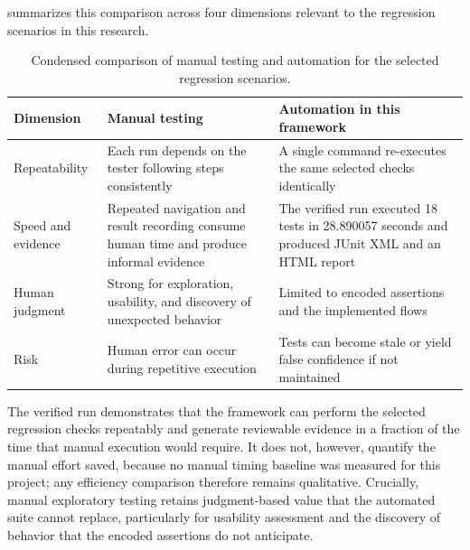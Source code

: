  summarizes this comparison across four dimensions relevant to the regression scenarios in this research.

\begin{table}[htbp]
  \centering
  \tablefont
  \begin{tabularx}{\textwidth}{YYY}
    \toprule
    Dimension & Manual testing & Automation in this framework \\
    \midrule
    Repeatability & Each run depends on the tester following steps consistently & A single command re-executes the same selected checks identically \\
    Speed and evidence & Repeated navigation and result recording consume human time and produce informal evidence & The verified run executed 18 tests in 28.890057 seconds and produced JUnit XML and an HTML report \\
    Human judgment & Strong for exploration, usability, and discovery of unexpected behavior & Limited to encoded assertions and the implemented flows \\
    Risk & Human error can occur during repetitive execution & Tests can become stale or yield false confidence if not maintained \\
    \bottomrule
  \end{tabularx}
  \caption{Condensed comparison of manual testing and automation for the selected regression scenarios.}
  \label{tab:ch5-manual-automation-comparison}
\end{table}

The verified run demonstrates that the framework can perform the selected regression checks repeatably and generate reviewable evidence in a fraction of the time that manual execution would require. It does not, however, quantify the manual effort saved, because no manual timing baseline was measured for this project; any efficiency comparison therefore remains qualitative. Crucially, manual exploratory testing retains judgment-based value that the automated suite cannot replace, particularly for usability assessment and the discovery of behavior that the encoded assertions do not anticipate.

\endgroup
